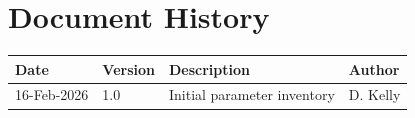 \documentclass[11pt,a4paper]{article}
\begin{document}
\clearpage

\section{Document History}
\begin{table}[ht]
    \centering
    \begin{tabular}{l|l|l|l}
        \textbf{Date} & \textbf{Version} & \textbf{Description} & \textbf{Author} \\
        \hline
        16-Feb-2026 & 1.0 & Initial parameter inventory & D. Kelly \\
    \end{tabular}
\end{table}
\end{document}
